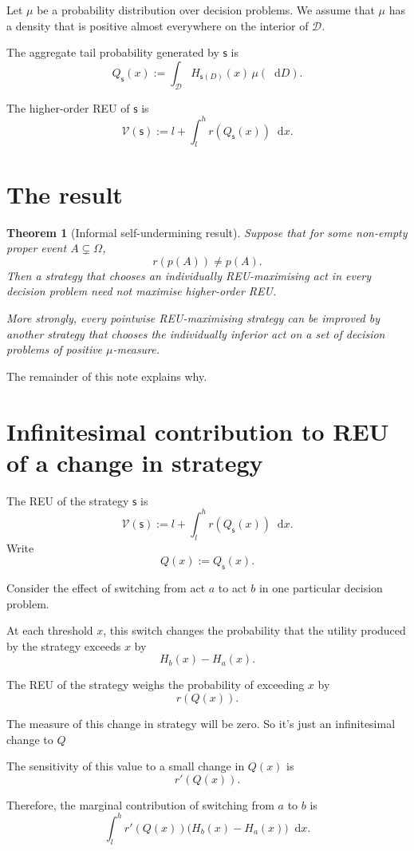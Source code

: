 \documentclass[a4paper,final]{article}
\newtheorem{theorem}{Theorem}[section]
\newcommand{\D}{\mathcal{D}}
\newcommand\s{\mathsf{s}}
\newcommand*\diff{\mathop{}\!\mathrm{d}}
\newenvironment{CCM rewritten}
{\begingroup\color{blue}} %
{\endgroup}              %
\begin{document}
Let $\mu$ be a probability distribution over decision problems. We assume
that $\mu$ has a density that is positive almost everywhere on the
interior of $\D$.

The aggregate tail probability generated by $\s$ is
\[
Q_{\s}(x)
:=
\int_{\D} H_{\s(D)}(x)\,\mu(\diff D).
\]

The higher-order REU of $\s$ is
\[
\mathcal V(\s)
:=
l+\int_l^h r(Q_{\s}(x))\diff x.
\]

\section{The result}

\begin{theorem}[Informal self-undermining result]
Suppose that for some non-empty proper event $A\subsetneq\Omega$,
\[
r(p(A))\neq p(A).
\]
Then a strategy that chooses an individually REU-maximising act in every
decision problem need not maximise higher-order REU.

More strongly, every pointwise REU-maximising strategy can be improved by
another strategy that chooses the individually inferior act on a set of
decision problems of positive $\mu$-measure.
\end{theorem}

The remainder of this note explains why.


\section{Infinitesimal contribution to REU of a change in strategy}

The REU of the strategy $\s$ is
\[
\mathcal V(\s)
:=
l+\int_l^h r(Q_{\s}(x))\diff x.
\]
Write
\[
Q(x):=Q_{\s}(x).
\]

Consider the effect of switching from act $a$ to act $b$ in one particular decision problem. 

At each threshold $x$, this switch changes the probability that the
utility produced by the strategy exceeds $x$ by
\[
H_b(x)-H_a(x).
\]

The REU of the strategy weighs the probability of exceeding $x$ by
\[
r(Q(x)).
\]

The measure of this change in strategy will be zero. So it's just an infinitesimal change to $Q$

The sensitivity of this value to a small change in $Q(x)$ is
\[
r'(Q(x)).
\]

Therefore, the marginal contribution of switching from $a$ to $b$ is
\[
\int_l^h
r'(Q(x))
\bigl(H_b(x)-H_a(x)\bigr)
\diff x.
\]
\end{document}
